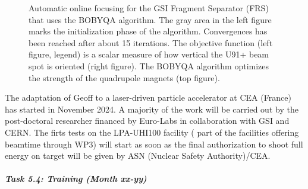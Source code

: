 \begin{figure}
    \caption{Automatic online focusing for the GSI Fragment Separator (FRS) that uses the BOBYQA algorithm. The gray area in the left figure marks the initialization phase of the algorithm. Convergences has been reached after about 15 iterations. The objective function (left figure, legend) is a scalar measure of how vertical the U91+ beam spot is oriented (right figure). The BOBYQA algorithm optimizes the strength of the quadrupole magnets (top figure).}
    \label{fig:wp5_frs}
\end{figure}

The adaptation of Geoff to a laser-driven particle accelerator
at CEA (France) has started in  November 2024. A majority of the work will be carried out by the post-doctoral researcher financed by Euro-Labs in collaboration with GSI and CERN. The firts tests on the LPA-UHI100 facility ( part of the facilities offering beamtime through WP3) will start as soon as the final authorization to shoot full energy on target will be given by ASN (Nuclear Safety Authority)/CEA. 

\subparagraph{Task 5.4: Training (Month xx-yy)} \mbox{}

